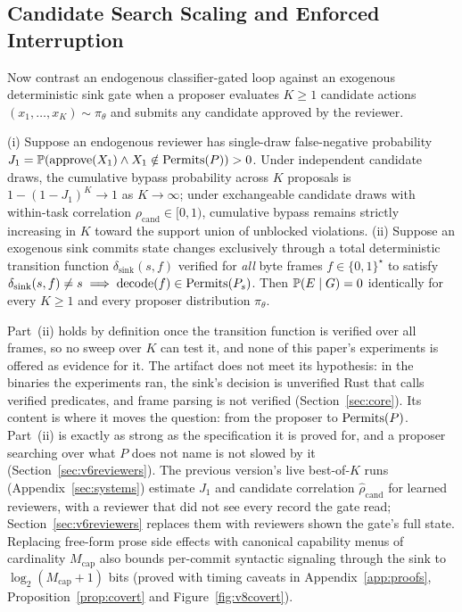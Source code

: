 \subsection{Candidate Search Scaling and Enforced Interruption}

Now contrast an endogenous classifier-gated loop against an exogenous deterministic sink gate when a proposer evaluates \(K \ge 1\) candidate actions \((x_1,\dots,x_K) \sim \pi_\theta\) and submits any candidate approved by the reviewer.

\begin{proposition}\label{prop:optinvariance}
(i) Suppose an endogenous reviewer has single-draw false-negative probability \(J_1 = \mathbb{P}(\text{approve}(X_1) \wedge X_1 \notin \operatorname{Permits}(P)) > 0\). Under independent candidate draws, the cumulative bypass probability across \(K\) proposals is \(1 - (1 - J_1)^K \to 1\) as \(K \to \infty\); under exchangeable candidate draws with within-task correlation \(\rho_{\mathrm{cand}} \in [0,1)\), cumulative bypass remains strictly increasing in \(K\) toward the support union of unblocked violations.
(ii) Suppose an exogenous sink commits state changes exclusively through a total deterministic transition function \(\delta_{\mathrm{sink}}(s, f)\) verified for \emph{all} byte frames \(f \in \{0,1\}^\star\) to satisfy \(\delta_{\mathrm{sink}}(s, f) \neq s \implies \operatorname{decode}(f) \in \operatorname{Permits}(P_s)\). Then \(\mathbb{P}(E \mid G) = 0\) identically for every \(K \ge 1\) and every proposer distribution \(\pi_\theta\).
\end{proposition}

Part~(ii) holds by definition once the transition function is verified over all frames, so no sweep over \(K\) can test it, and none of this paper's experiments is offered as evidence for it. The
artifact does not meet its hypothesis: in the binaries the experiments ran, the sink's decision is unverified Rust that
calls verified predicates, and frame parsing is not verified (Section~\ref{sec:core}). Its content is where it moves the question: from the proposer to \(\operatorname{Permits}(P)\). Part~(ii) is exactly as strong as the specification it is proved for, and a proposer searching over what \(P\) does not name is not slowed by it (Section~\ref{sec:v6reviewers}). The previous version's live best-of-\(K\) runs (Appendix~\ref{sec:systems}) estimate \(J_1\) and candidate correlation \(\hat{\rho}_{\mathrm{cand}}\) for learned reviewers, with a reviewer that did not see every record the gate read; Section~\ref{sec:v6reviewers} replaces them with reviewers shown the gate's full state. Replacing free-form prose side effects with canonical capability menus of cardinality \(M_{\mathrm{cap}}\) also bounds per-commit syntactic signaling through the sink to \(\log_2(M_{\mathrm{cap}} + 1)\) bits (proved with timing caveats in Appendix~\ref{app:proofs}, Proposition~\ref{prop:covert} and Figure~\ref{fig:v8covert}).

